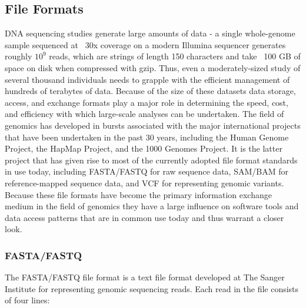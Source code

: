 \subsection{File Formats}
\label{sec:bg_file_formats}

DNA sequencing studies generate large amounts of data - a single whole-genome sample sequenced at ~30x coverage on a modern Illumina sequencer generates roughly $10^9$ reads, which are strings of length 150 characters and take ~100 GB of space on disk when compressed with gzip. Thus, even a moderately-sized study of several thousand individuals needs to grapple with the efficient management of hundreds of terabytes of data. Because of the size of these datasets data storage, access, and exchange formats play a major role in determining the speed, cost, and efficiency with which large-scale analyses can be undertaken. The field of genomics has developed in bursts associated with the major international projects that have been undertaken in the past 30 years, including the Human Genome Project\autocite{lander2001initial}, the HapMap Project\autocite{international2003international}, and the 1000 Genomes Project\autocite{10002010map}. It is the latter project that has given rise to most of the currently adopted file format standards in use today, including FASTA/FASTQ for raw sequence data, SAM/BAM for reference-mapped sequence data, and VCF for representing genomic variants. Because these file formats have become the primary information exchange medium in the field of genomics they have a large influence on software tools and data access patterns that are in common use today and thus warrant a closer look.

\subsubsection{FASTA/FASTQ}

The FASTA/FASTQ file format is a text file format developed at The Sanger Institute for representing genomic sequencing reads\autocite{cock2009sanger}. Each read in the file consists of four lines:

